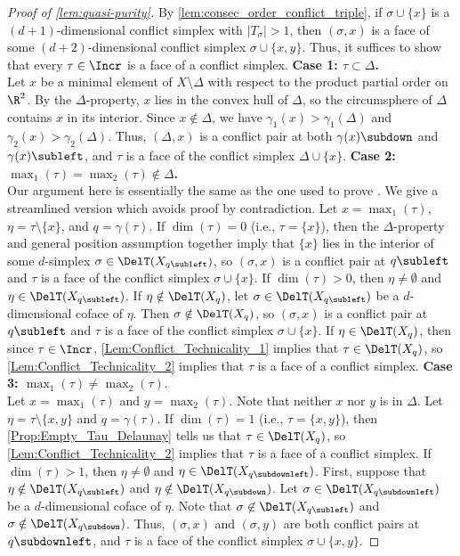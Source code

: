 \begin{proof}[Proof of \cref{lem:quasi-purity}]
By \cref{lem:consec_order_conflict_triple}, if $\sigma \cup \{x\}$ is a $(d+1)$-dimensional conflict simplex with $|T_{\sigma}|>1$, then $(\sigma, x)$ is a face of some $(d+2)$-dimensional conflict simplex $\sigma \cup \{x, y\}$.  Thus, it suffices to show that every $\tau \in \Incr$ is a face of a conflict simplex.
%
%
%
\medskip\noindent\textbf{Case 1: $\tau\subset \Delta$.}\\
Let $x$ be a minimal element of $X\setminus \Delta$ with respect to the product partial order on $\R^2$.  By the $\Delta$-property, $x$ lies in the convex hull of $\Delta$, so the circumsphere
of $\Delta$ contains $x$ in its interior. Since $x \notin \Delta$, we
have $\gamma_1(x) > \gamma_1(\Delta)$ and $\gamma_2(x) > \gamma_2(\Delta)$.  Thus, 
$(\Delta, x)$ is a conflict pair at both $\gamma(x){\subdown}$ and $\gamma(x){\subleft}$, and $\tau$ is a face of the conflict simplex $\Delta\cup\{x\}$.
%
\medskip\noindent\textbf{Case 2:  $\max_1(\tau)=\max_2(\tau)\notin \Delta$.}\\
Our argument here is essentially the same as the one used to prove \cite[Lemma 2.3]{alonsoDelaunayBifiltrationsFunctions2024}.  We give a streamlined version which avoids proof by contradiction.  
%
Let $x=\max_1(\tau)$, $\eta=\tau\setminus\{x\}$, and $q=\gamma(\tau)$.  If $\dim(\tau)=0$ (i.e., $\tau=\{x\}$), then the $\Delta$-property and general position assumption together imply that  $\{x\}$ lies in the interior of some $d$-simplex $\sigma\in \DelT(X_{q{\subleft}})$, so $(\sigma,x)$ is a conflict pair at $q{\subleft}$ and $\tau$ is a face of the conflict simplex $\sigma\cup\{x\}$.  If $\dim(\tau)>0$, then $\eta\ne\emptyset$ and $\eta\in \DelT(X_{q{\subleft}})$.  If $\eta\notin \DelT(X_{q})$, let $\sigma\in \DelT(X_{q{\subleft}})$ be a $d$-dimensional coface of $\eta$.  Then $\sigma\notin \DelT(X_{q})$, so $(\sigma, x)$ is a conflict pair at $q{\subleft}$ and $\tau$ is a face of the conflict simplex $\sigma\cup\{x\}$.  If $\eta\in \DelT(X_{q})$, then since $\tau\in \Incr$, \cref{Lem:Conflict_Technicality_1} implies that $\tau\in \DelT(X_{q})$, so \cref{Lem:Conflict_Technicality_2} implies that $\tau$ is a face of a conflict simplex.  
%
\medskip\noindent\textbf{Case 3:  $\max_1(\tau)\ne\max_2(\tau)$}.\\
Let $x=\max_1(\tau)$ and $y=\max_2(\tau)$.  Note that neither $x$ nor $y$ is in $\Delta$.  Let $\eta=\tau\setminus\{x,y\}$ and $q=\gamma(\tau)$.  If $\dim(\tau)=1$ (i.e., $\tau=\{x,y\}$), then \cref{Prop:Empty_Tau_Delaunay} tells us that $\tau\in \DelT(X_q)$, so \cref{Lem:Conflict_Technicality_2} implies that $\tau$ is a face of a conflict simplex.  If $\dim(\tau)>1$, then $\eta\ne\emptyset$ and $\eta\in \DelT(X_{q{\subdownleft}})$.  First, suppose that $\eta\notin \DelT(X_{q{\subleft}})$ and $\eta\notin \DelT(X_{q{\subdown}})$.  Let $\sigma\in \DelT(X_{q{\subdownleft}})$ be a $d$-dimensional coface of $\eta$.    Note that $\sigma\not\in \DelT(X_{q{\subleft}})$ and $\sigma\notin \DelT(X_{q{\subdown}})$.  Thus, $(\sigma, x)$ and $(\sigma, y)$ are both conflict pairs at $q{\subdownleft}$, and $\tau$ is a face of the conflict simplex $\sigma\cup\{x,y\}$.  

\end{proof}
